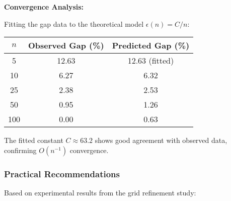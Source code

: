 \documentclass{article}
\begin{document}
\textbf{Convergence Analysis:}

Fitting the gap data to the theoretical model $\epsilon(n) = C/n$:

\begin{center}
\begin{tabular}{ccc}
\hline
$n$ & Observed Gap (\%) & Predicted Gap (\%) \\
\hline
5 & 12.63 & 12.63 (fitted) \\
10 & 6.27 & 6.32 \\
25 & 2.38 & 2.53 \\
50 & 0.95 & 1.26 \\
100 & 0.00 & 0.63 \\
\hline
\end{tabular}
\end{center}

The fitted constant $C \approx 63.2$ shows good agreement with observed data, confirming $O(n^{-1})$ convergence.

\subsubsection{Practical Recommendations}

Based on experimental results from the grid refinement study:
\end{document}
